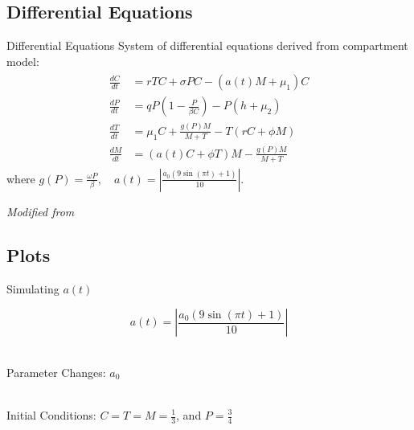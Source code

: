 \documentclass{beamer}
\begin{document}
\subsection{Differential Equations}
\begin{frame}{Differential Equations}
    System of differential equations derived from compartment model:
    \begin{align*}
        \begin{split}
            \frac{dC}{dt} &= rTC + \sigma PC- (a(t)M+\mu_{1})C\\
            \frac{dP}{dt} &= qP \left( 1-\frac{P}{\beta C} \right) - P \left( h+\mu_{2} \right)\\
            \frac{dT}{dt} &= \mu_{1}C + \frac{g(P)M}{M+T} - T(rC+\phi M)\\
            \frac{dM}{dt} &= (a(t)C+ \phi T)M - \frac{g(P)M}{M+T}
            \label{SoODE}
        \end{split}
    \end{align*}
    where $g(P) = \frac{\omega P}{\beta}, \quad a(t)=|\frac{a_{0}(9\sin{(\pi t) }+1)}{10}|$.\\ 
    \quad
    \begin{center}
        \textit{Modified from \cite{13_blackwood_hastings_mumby_2010}}
    \end{center}
\end{frame}

\subsection{Plots}
\begin{frame}{Simulating $a(t)$}
    \begin{center}
        $$a(t)= \left|\frac{a_{0}(9\sin{(\pi t) }+1)}{10} \right|$$\\
    \end{center}
    
\end{frame}

\begin{frame}{Parameter Changes: $a_{0}$}
    \begin{center}
        \\
        Initial Conditions: $C = T = M = \frac{1}{3}$, and $P = \frac{3}{4}$
    \end{center}
\end{frame}
\end{document}
